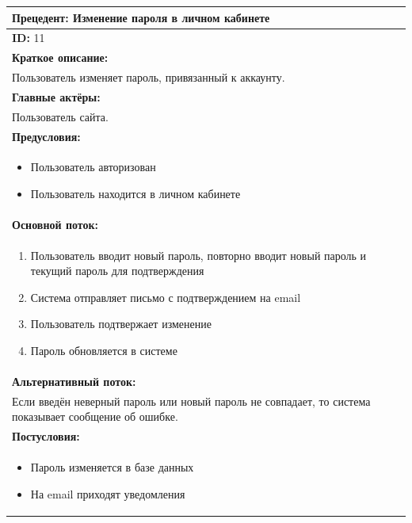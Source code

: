 \documentclass{scrreprt}
\begin{document}
\vspace{10px}
\noindent
\begin{tabularx}{\textwidth}{|X|}
	\hline
	\textbf{Прецедент: Изменение пароля в личном кабинете} \\
	\hline
	\textbf{ID:} 11 \\
	\hline
	\textbf{Краткое описание:} \\
	Пользователь изменяет пароль, привязанный к аккаунту.\\
	\hline
	\textbf{Главные актёры:} \\
	Пользователь сайта. \\
	\hline
	\textbf{Предусловия:} \\
	\begin{itemize}[nosep,leftmargin=*]
		\item Пользователь авторизован 
		\item Пользователь находится в личном кабинете
	\end{itemize} \\
	\hline
	\textbf{Основной поток:} \\
	\begin{enumerate}[nosep,leftmargin=*]
		\item Пользователь вводит новый пароль, повторно вводит новый пароль и текущий пароль для подтверждения
		\item Система отправляет письмо с подтверждением на email
		\item Пользователь подтвержает изменение
		\item Пароль обновляется в системе 
	\end{enumerate} \\
	\hline
	\textbf{Альтернативный поток:} \\
	Если введён неверный пароль или новый пароль не совпадает, то система показывает сообщение об ошибке.\\
	\hline
	\textbf{Постусловия:} \\
	\begin{itemize}[nosep,leftmargin=*]
		\item Пароль изменяется в базе данных
		\item На email приходят уведомления
	\end{itemize} \\
	\hline
\end{tabularx}
\end{document}

